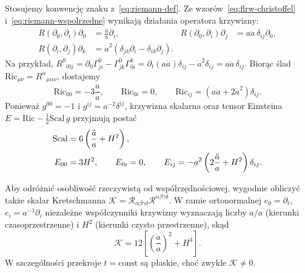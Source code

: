 
\begin{przyklad}
\label{prz:flrw-krzywizna}
Stosujemy konwencję znaku z~\eqref{eq:riemann-def}.
Ze wzorów~\eqref{eq:flrw-christoffel}
i~\eqref{eq:riemann-wspolrzedne} wynikają działania
operatora krzywizny:
\begin{align*}
 R(\partial_0,\partial_i)\partial_0
   &=\frac{\ddot a}{a}\partial_i, &
 R(\partial_0,\partial_i)\partial_j
   &=a\ddot a\,\delta_{ij}\partial_0,\\
 R(\partial_i,\partial_j)\partial_k
   &=\dot a^2(\delta_{jk}\partial_i-\delta_{ik}\partial_j).
\end{align*}
Na przykład,
$R^0{}_{i0j}=\partial_0\Gamma^0_{ji}
-\Gamma^0_{jk}\Gamma^k_{0i}
=\partial_t(a\dot a)\delta_{ij}-\dot a^2\delta_{ij}
=a\ddot a\,\delta_{ij}$.
Biorąc ślad $\mathrm{Ric}_{\mu\nu}=R^\alpha{}_{\mu\alpha\nu}$,
dostajemy
\begin{equation}\label{eq:flrw-ricci}
 \mathrm{Ric}_{00}=-3\frac{\ddot a}{a},\qquad
 \mathrm{Ric}_{0i}=0,\qquad
 \mathrm{Ric}_{ij}=(a\ddot a+2\dot a^2)\delta_{ij}.
\end{equation}
Ponieważ $g^{00}=-1$ i $g^{ij}=a^{-2}\delta^{ij}$,
krzywizna skalarna oraz tensor Einsteina
$E=\mathrm{Ric}-\tfrac12\mathrm{Scal}\,g$ przyjmują postać
\begin{align}\label{eq:flrw-scalar-einstein}
 \mathrm{Scal}
  &=6\left(\frac{\ddot a}{a}+H^2\right),\notag\\
 E_{00}&=3H^2,\qquad E_{0i}=0,\qquad
 E_{ij}=-a^2\left(2\frac{\ddot a}{a}+H^2\right)\delta_{ij}.
\end{align}

Aby odróżnić osobliwość rzeczywistą od współrzędnościowej,
wygodnie obliczyć także skalar Kretschmanna
$\mathcal K=\mathcal R_{\alpha\beta\gamma\delta}
\mathcal R^{\alpha\beta\gamma\delta}$.
W ramie ortonormalnej $e_0=\partial_t$, $e_i=a^{-1}\partial_i$
niezależne współczynniki krzywizny wyznaczają liczby
$\ddot a/a$ (kierunki czasoprzestrzenne) i $H^2$
(kierunki czysto przestrzenne), skąd
\begin{equation}\label{eq:flrw-kretschmann}
 \mathcal K=12\left[\left(\frac{\ddot a}{a}\right)^2+H^4\right].
\end{equation}
W szczególności przekroje $t=\mathrm{const}$ są płaskie,
choć zwykle $\mathcal K\ne0$.
\end{przyklad}


